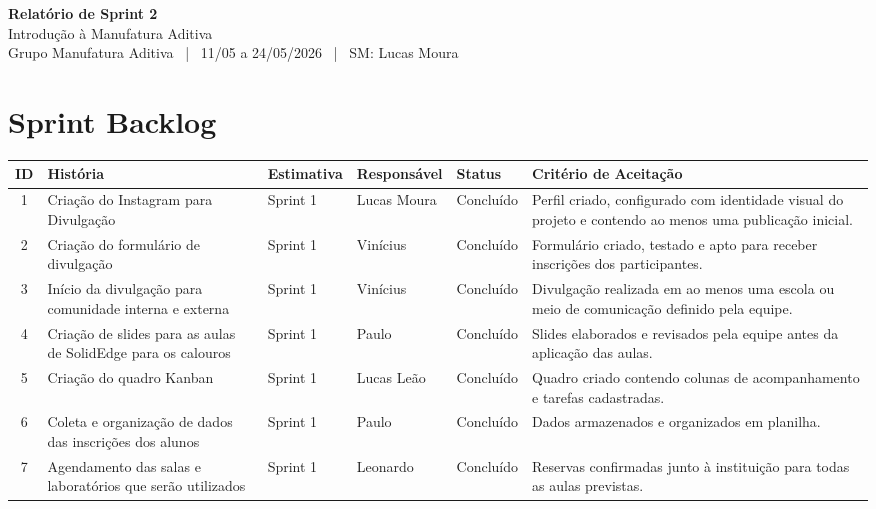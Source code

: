 \documentclass[12pt,a4paper]{article}
\newcommand{\projetotitulo}{Introdução à Manufatura Aditiva}
\newcommand{\grupoid}{Grupo Manufatura Aditiva}
\newcommand{\sprintnum}{2}
\newcommand{\sprintperiodo}{11/05 a 24/05/2026}
\newcommand{\scrummaster}{Lucas Moura}
\begin{document}
\begin{center}
{\Large\bfseries Relatório de Sprint \sprintnum}\\
{\large \projetotitulo}\\
\grupoid{} \ | \ \sprintperiodo{} \ | \ SM: \scrummaster
\end{center}

\section{Sprint Backlog}

\begin{longtable}{|c|p{3.8cm}|p{1.9cm}|p{2.2cm}|p{1.7cm}|p{4.2cm}|}
\toprule
ID & História & Estimativa & Responsável & Status & Critério de Aceitação \\
\midrule
1 & Criação do Instagram para Divulgação & Sprint 1 & Lucas Moura & Concluído & Perfil criado, configurado com identidade visual do projeto e contendo ao menos uma publicação inicial. \\ \hline

2 & Criação do formulário de divulgação & Sprint 1 & Vinícius & Concluído & Formulário criado, testado e apto para receber inscrições dos participantes. \\ \hline

3 & Início da divulgação para comunidade interna e externa & Sprint 1 & Vinícius & Concluído & Divulgação realizada em ao menos uma escola ou meio de comunicação definido pela equipe. \\ \hline

4 & Criação de slides para as aulas de SolidEdge para os calouros & Sprint 1 & Paulo & Concluído & Slides elaborados e revisados pela equipe antes da aplicação das aulas. \\ \hline

5 & Criação do quadro Kanban & Sprint 1 & Lucas Leão & Concluído & Quadro criado contendo colunas de acompanhamento e tarefas cadastradas. \\ \hline

6 & Coleta e organização de dados das inscrições dos alunos & Sprint 1 & Paulo & Concluído & Dados armazenados e organizados em planilha. \\ \hline

7 & Agendamento das salas e laboratórios que serão utilizados & Sprint 1 & Leonardo & Concluído & Reservas confirmadas junto à instituição para todas as aulas previstas. \\ \hline


\end{longtable}
\end{document}
